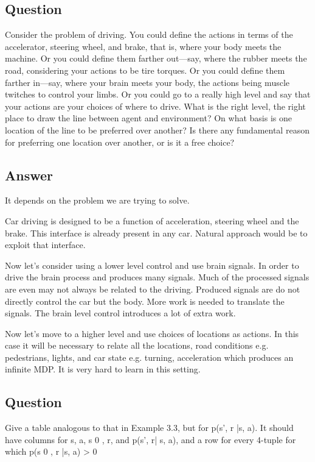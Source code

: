 \documentclass[11pt]{article}
\begin{document}
    \subsection{Question}
    Consider the problem of driving.
    You could define the actions in terms of the accelerator, steering wheel, and brake, that is, where your body meets the machine.
    Or you could define them farther out—say, where the rubber meets the road, considering your actions to be tire torques.
    Or you could define them farther in—say, where your brain meets your body, the actions being muscle twitches to control your limbs.
    Or you could go to a really high level and say that your actions are your choices of where to drive.
    What is the right level, the right place to draw the line between agent and environment?
    On what basis is one location of the line to be preferred over another?
    Is there any fundamental reason for preferring one location over another, or is it a free choice?

    \subsection*{Answer}
    It depends on the problem we are trying to solve.

    Car driving is designed to be a function of acceleration, steering wheel and the brake.
    This interface is already present in any car.
    Natural approach would be to exploit that interface.

    Now let's consider using a lower level control and use brain signals.
    In order to drive the brain process and produces many signals.
    Much of the processed signals are even may not always be related to the driving.
    Produced signals are do not directly control the car but the body.
    More work is needed to translate the signals.
    The brain level control introduces a lot of extra work.

    Now let's move to a higher level and use choices of locations as actions.
    In this case it will be necessary to relate all the locations, road conditions e.g. pedestrians, lights, and car state e.g. turning, acceleration which produces an infinite MDP.
    It is very hard to learn in this setting.

    \subsection{Question}

    Give a table analogous to that in Example 3.3, but for p(s', r |s, a).
    It should have columns for s, a, s 0 , r, and p(s', r| s, a), and a row for every 4-tuple for which p(s 0 , r |s, a) > 0
\end{document}
